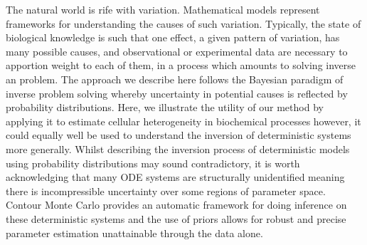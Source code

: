 The natural world is rife with variation. Mathematical models represent frameworks for understanding the causes of such variation. Typically, the state of biological knowledge is such that one effect, a given pattern of variation, has many possible causes, and observational or experimental data are necessary to apportion weight to each of them, in a process which amounts to solving inverse an problem. The approach we describe here follows the Bayesian paradigm of inverse problem solving whereby uncertainty in potential causes is reflected by probability distributions. Here, we illustrate the utility of our method by applying it to estimate cellular heterogeneity in biochemical processes however, it could equally well be used to understand the inversion of deterministic systems more generally. Whilst describing the inversion process of deterministic models using probability distributions may sound contradictory, it is worth acknowledging that many ODE systems are structurally unidentified meaning there is incompressible uncertainty over some regions of parameter space. Contour Monte Carlo provides an automatic framework for doing inference on these deterministic systems and the use of priors allows for robust and precise parameter estimation unattainable through the data alone.

